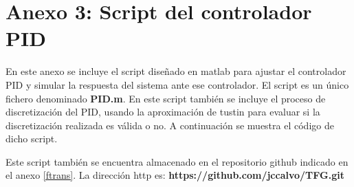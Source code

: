 \newpage
\section{Anexo 3: Script del controlador PID}\label{Anexo:scriptPID}

	En este anexo se incluye el script diseñado en matlab para ajustar el controlador PID y simular la respuesta del sistema ante ese controlador. El script es un único fichero denominado \textbf{PID.m}. En este script también se incluye el proceso de discretización del PID, usando la aproximación de tustin para evaluar si la discretización realizada es válida o no. A continuación se muestra el código de dicho script.

	Este script también se encuentra almacenado en el repositorio github indicado en el anexo \ref{ftrans}. La dirección http es: \textbf{https://github.com/jccalvo/TFG.git}

